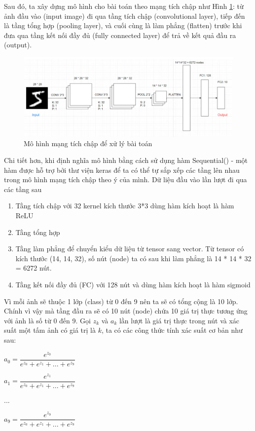 \documentclass[a4paper]{article}
\begin{document}
Sau đó, ta xây dựng mô hình cho bài toán theo mạng tích chập như Hình \ref{fig:model MNIST}: từ ảnh đầu vào (input image) đi qua tầng tích chập (convolutional layer), tiếp đến là tầng tổng hợp (pooling layer), và cuối cùng là làm phẳng (flatten) trước khi đưa qua tầng kết nối đầy đủ (fully connected layer) để trả về kết quả đầu ra (output).

\begin{figure}
    \centering
    \includegraphics[width=1.0\textwidth]{image/model MNIST.png}
    \caption{Mô hình mạng tích chập để xử lý bài toán}
    \label{fig:model MNIST}
\end{figure}

Chi tiết hơn, khi định nghĩa mô hình bằng cách sử dụng hàm Sequential() - một hàm được hỗ trợ bởi thư viện keras để ta có thể tự sắp xếp các tầng lên nhau trong mô hình mạng tích chập theo ý của mình. Dữ liệu đầu vào lần lượt đi qua các tầng sau
\begin{enumerate}
    \item Tầng tích chập với 32 kernel kích thước 3*3 dùng hàm kích hoạt là hàm ReLU
    \item Tầng tổng hợp
    \item Tầng làm phẳng để chuyển kiểu dữ liệu từ tensor sang vector. Từ tensor có kích thước (14, 14, 32), số nút (node) ta có sau khi làm phẳng là 14 * 14 * 32 = 6272 nút.
    \item Tầng kết nối đầy đủ (FC) với 128 nút và dùng hàm kích hoạt là hàm sigmoid
\end{enumerate}



Vì mỗi ảnh sẽ thuộc 1 lớp (class) từ 0 đến 9 nên ta sẽ có tổng cộng là 10 lớp. Chính vì vậy mà tầng đầu ra sẽ có 10 nút (node) chứa 10 giá trị thực tương ứng với ảnh là số từ 0 đến 9. Gọi $z_{k}$ và $a_{k}$ lần lượt là giá trị thực trong nút và xác suất một tấm ảnh có giá trị là $k$, ta có các công thức tính xác suất cơ bản như sau:

\begin{center}
    $a_{0} = \dfrac{e^{z_{0}}}{e^{z_{0}}+e^{z_{1}}+...+e^{z_{9}}}$ 
    
     $a_{1} = \dfrac{e^{z_{1}}}{e^{z_{0}}+e^{z_{1}}+...+e^{z_{9}}}$ 
     
     ...
     
      $a_{9} = \dfrac{e^{z_{9}}}{e^{z_{0}}+e^{z_{1}}+...+e^{z_{9}}}$ 
\end{center}
\end{document}
